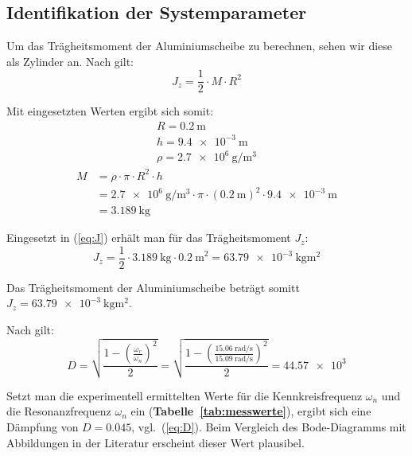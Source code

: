 \documentclass[a4paper,12pt]{scrartcl}
\begin{document}
\subsection{Identifikation der Systemparameter} %

Um das Trägheitsmoment der Aluminiumscheibe zu berechnen, sehen wir diese als Zylinder an.
Nach \cite{tbmetall}  gilt:
\begin{equation}
	\label{eq:J}
	J_z = \frac{1}{2} \cdot M \cdot R^2
\end{equation}

Mit eingesetzten Werten ergibt sich somit:
\begin{gather}
	R = \SI{0.2}{\metre} \\
	h = \SI{9.4e-3}{\metre} \\
	\rho = \SI{2.7e6}{\gram\per\cubic\metre}
\end{gather}
\begin{align}
	M &= \rho \cdot \pi \cdot R^2 \cdot h \\
	&= \SI{2.7e6}{\gram\per\cubic\metre} \cdot \pi \cdot \left( \SI{0.2}{\metre} \right)^2 \cdot \SI{9.4e-3}{\metre} \\
	&= \SI{3.189}{\kilogram}
\end{align}

Eingesetzt in (\ref{eq:J}) erhält man für das Trägheitsmoment $J_{z}$:
\begin{equation}
	J_z = \frac{1}{2} \cdot \SI{3.189}{\kilogram} \cdot {\SI{0.2}{\metre}}^2 = \SI{63.79e-3}{\kilogram\square\metre}
\end{equation}

Das Trägheitsmoment der Aluminiumscheibe beträgt somitt $J_{z} = \SI{63.79e-3}{\kilogram\square\metre}$.

Nach \cite{skript} gilt:
\begin{equation}
	\label{eq:D}
	D = \sqrt{ \frac{1 - \left( \frac{\omega_{r}}{\omega_{n}} \right)^{2}}{2} }
		= \sqrt{ \frac{1 - \left( \frac{\SI{15.06}{\radian\per\second}}{\SI{15.09}{\radian\per\second}} \right)^{2}}{2} }
		= \num{44.57e3}
\end{equation}

Setzt man die experimentell ermittelten Werte für die Kennkreisfrequenz $\omega_{n}$ und die Resonanzfrequenz $\omega_{n}$ ein (\textbf{Tabelle~\ref{tab:messwerte}}), ergibt sich eine Dämpfung von $D = 0.045$, vgl.~(\ref{eq:D}). Beim Vergleich des Bode-Diagramms mit Abbildungen in der Literatur erscheint dieser Wert plausibel.
\end{document}
